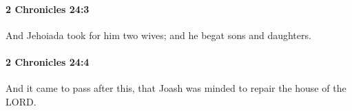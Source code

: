 		\paragraph{2 Chronicles 24:3} %
			\label{2CHRONICLES-24-3}

			And Jehoiada took for him two wives; and he begat sons and daughters.


		\paragraph{2 Chronicles 24:4} %
			\label{2CHRONICLES-24-4}

			And it came to pass after this, that Joash was minded to repair the house of the LORD.


